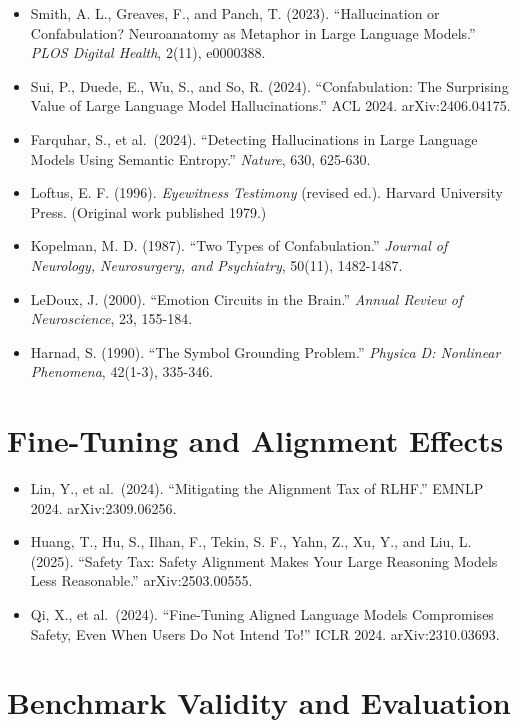 \documentclass[12pt]{article}
\providecommand{\tightlist}{\setlength{\itemsep}{0pt}\setlength{\parskip}{0pt}}
\begin{document}
\begin{itemize}
\tightlist
\item
  Smith, A. L., Greaves, F., and Panch, T. (2023). ``Hallucination or
  Confabulation? Neuroanatomy as Metaphor in Large Language Models.''
  \emph{PLOS Digital Health}, 2(11), e0000388.
\item
  Sui, P., Duede, E., Wu, S., and So, R. (2024). ``Confabulation: The
  Surprising Value of Large Language Model Hallucinations.'' ACL 2024.
  arXiv:2406.04175.
\item
  Farquhar, S., et al.~(2024). ``Detecting Hallucinations in Large
  Language Models Using Semantic Entropy.'' \emph{Nature}, 630, 625-630.
\item
  Loftus, E. F. (1996). \emph{Eyewitness Testimony} (revised ed.).
  Harvard University Press. (Original work published 1979.)
\item
  Kopelman, M. D. (1987). ``Two Types of Confabulation.'' \emph{Journal
  of Neurology, Neurosurgery, and Psychiatry}, 50(11), 1482-1487.
\item
  LeDoux, J. (2000). ``Emotion Circuits in the Brain.'' \emph{Annual
  Review of Neuroscience}, 23, 155-184.
\item
  Harnad, S. (1990). ``The Symbol Grounding Problem.'' \emph{Physica D:
  Nonlinear Phenomena}, 42(1-3), 335-346.
\end{itemize}

\section{Fine-Tuning and Alignment
Effects}\label{fine-tuning-and-alignment-effects}

\begin{itemize}
\tightlist
\item
  Lin, Y., et al.~(2024). ``Mitigating the Alignment Tax of RLHF.''
  EMNLP 2024. arXiv:2309.06256.
\item
  Huang, T., Hu, S., Ilhan, F., Tekin, S. F., Yahn, Z., Xu, Y., and Liu,
  L. (2025). ``Safety Tax: Safety Alignment Makes Your Large Reasoning
  Models Less Reasonable.'' arXiv:2503.00555.
\item
  Qi, X., et al.~(2024). ``Fine-Tuning Aligned Language Models
  Compromises Safety, Even When Users Do Not Intend To!'' ICLR 2024.
  arXiv:2310.03693.
\end{itemize}

\section{Benchmark Validity and
Evaluation}\label{benchmark-validity-and-evaluation}
\end{document}
